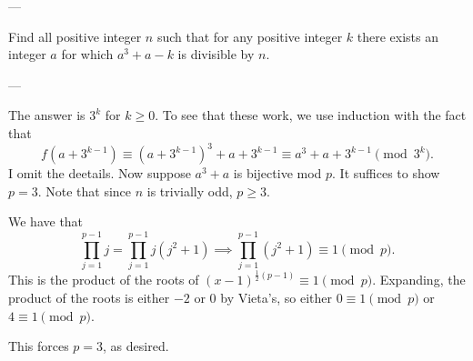 
---

Find all positive integer $n$ such that for any positive integer $k$ there exists an integer $a$ for which $a^3+a-k$ is divisible by $n$.

---

The answer is $3^k$ for $k\ge0$. To see that these work, we use induction with the fact that \[f\left(a+3^{k-1}\right)\equiv\left(a+3^{k-1}\right)^3+a+3^{k-1}\equiv a^3+a+3^{k-1}\pmod{3^k}.\]
I omit the deetails. Now suppose $a^3+a$ is bijective mod $p$. It suffices to show $p=3$. Note that since $n$ is trivially odd, $p\ge3$.

We have that \[\prod_{j=1}^{p-1}j=\prod_{j=1}^{p-1}j(j^2+1)\implies\prod_{j=1}^{p-1}(j^2+1)\equiv1\pmod p.\]
This is the product of the roots of $(x-1)^{\frac12(p-1)}\equiv1\pmod p$. Expanding, the product of the roots is either $-2$ or $0$ by Vieta's, so either $0\equiv1\pmod p$ or $4\equiv1\pmod p$.

This forces $p=3$, as desired.
